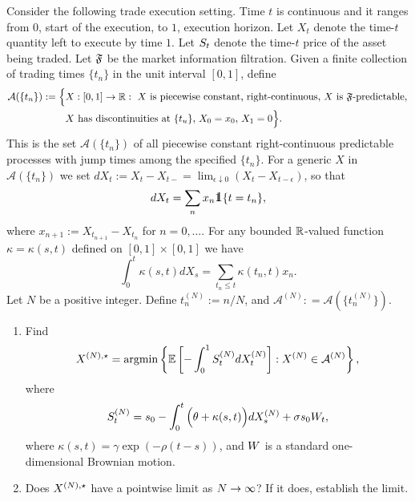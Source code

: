 \documentclass[10pt,a4paper]{article}
\begin{document}
\begin{exercise}
  \label{ex.conttime_limit}
Consider the following trade execution setting. 
Time $t$ is continuous and it ranges from $0$, start of the execution, to $1$, execution horizon.
Let $X_t$ denote the time-$t$ quantity left to execute by time $1$. 
Let $S_t$ denote the time-$t$ price of the asset being traded.
Let $\mathfrak{F}$ be the market information filtration.
Given a finite collection of trading times $\lbrace t_n \rbrace$ in the unit interval $[0,1]$, define
\begin{equation*}
\begin{split}
\mathcal{A}(\lbrace t_n \rbrace) := 
\Big\lbrace &
X: [0,1] \rightarrow \mathbb{R}: \, \, 
X \text{ is piecewise constant, right-continuous}, \,
X \text{ is } \mathfrak{F}\text{-predictable}, \,
\\
&
X \text{ has discontinuities at } \lbrace t_u \rbrace,\,
X_{0} = x_0, \, X_{1} = 0 
\Big\rbrace.
\end{split}
\end{equation*}
This is the set 
$\mathcal{A}(\lbrace t_n \rbrace)$
of all piecewise constant right-continuous predictable processes
with jump times among the specified $\lbrace t_n \rbrace$. 
For a generic $X$ in 
$\mathcal{A}(\lbrace t_n \rbrace)$
we set $dX_{t} := X_t - X_{t-} = \lim_{\epsilon\downarrow 0 } (X_{t} - X_{t-\epsilon})$, 
so that 
\begin{equation*}
dX_{t} = \sum_{n} x_n \one \lbrace t = t_n \rbrace,
\end{equation*}
where $x_{n+1} := X_{t_{n+1}} - X_{t_n}$ for $n=0,\dots$.
For any bounded $\mathbb{R}$-valued function $\kappa = \kappa(s,t)$ defined on $[0,1]\times[0,1]$ we have 
\begin{equation*}
\int_{0}^{t} \kappa(s,t)dX_{s} = \sum_{t_n \leq t } \kappa(t_n, t) x_n.
\end{equation*}
Let $N$ be a positive integer.
Define $t_n^{(N)} := n/N$, and 
$\mathcal{A}^{(N)} : = \mathcal{A}(\lbrace t_{n}^{(N)} \rbrace ). $
\begin{enumerate}[label={\textbf{\ref{ex.conttime_limit}.\arabic{*}}}, ref={Exercise {\ref{ex.conttime_limit}.\arabic{*}}}]
\item
Find 
\begin{equation*}
X^{(N), \star}
=
\mathrm{argmin}
\left\lbrace
  \mathbb{{E}}\left[
-\int_{0}^{1}
S^{(N)}_{t}dX^{(N)}_t 
  \right]
  :
X^{(N)} \in \mathcal{A}^{(N)}
\right\rbrace,
\end{equation*}
where 
\begin{equation*}
S^{(N)}_t 
=
s_0 
- \int_{0}^{t} 
  \Big( 
  \theta + \kappa(s,t)
  \Big)
  dX^{(N)}_s
+ \sigma s_0 W_t,
\end{equation*}
where $\kappa(s,t) = \gamma\exp(-\rho(t-s))$,
and $W$ is a standard one-dimensional Brownian motion.
\item
Does 
$X^{(N), \star}$
have a pointwise limit
as $N\rightarrow \infty$? If it does, establish the limit. 
\end{enumerate}
\end{exercise}
\end{document}
